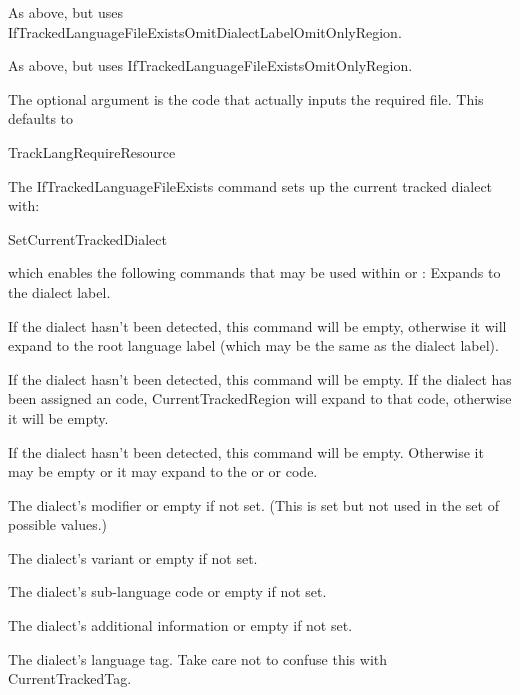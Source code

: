 \documentclass[titlepage=false,oneside,
 fontsize=12pt,captions=tableheading]{scrbook}
\begin{document}
As above, but uses
\gls{IfTrackedLanguageFileExistsOmitDialectLabelOmitOnlyRegion}.

As above, but uses
\gls{IfTrackedLanguageFileExistsOmitOnlyRegion}.

The optional argument  is the code that actually
inputs the required file. This defaults to
\begin{codebox}
\gls{TrackLangRequireResource}
\end{codebox}

The \gls{IfTrackedLanguageFileExists} command sets up the current
tracked dialect with:
\begin{compactcodebox*}
\gls{SetCurrentTrackedDialect}
\end{compactcodebox*}
which enables the following commands that may be used within 
 or :
Expands to the dialect label.

If the dialect hasn't been detected, this command will be empty,
otherwise it will expand to the root language label (which may
be the same as the dialect label).

If the dialect hasn't been detected, this command will be empty.
If the dialect has been assigned an  code,
\gls{CurrentTrackedRegion} will expand to that code, otherwise it
will be empty.

If the dialect hasn't been detected, this command will be empty.
Otherwise it may be empty or it may expand to the
 or  or  code.

The dialect's modifier or empty if not set. (This is set but not
used in the set of possible  values.)

The dialect's variant or empty if not set.

The dialect's sub-language code or empty if not set.

The dialect's additional information or empty if not set.

The dialect's language tag. Take care not to confuse this
with \gls{CurrentTrackedTag}.
\end{document}
